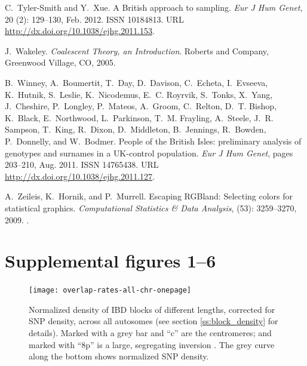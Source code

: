 \documentclass{article}
\begin{document}
\begin{thebibliography}{76}
C.~Tyler-Smith and Y.~Xue.
\newblock A {British} approach to sampling.
\newblock \emph{Eur J Hum Genet}, 20 (2): 129--130, Feb.
  2012.
\newblock ISSN 10184813.
\newblock URL \url{http://dx.doi.org/10.1038/ejhg.2011.153}.

J.~Wakeley.
\newblock \emph{Coalescent Theory, an Introduction}.
\newblock Roberts and Company, Greenwood Village, CO, 2005.

B.~Winney, A.~Boumertit, T.~Day, D.~Davison, C.~Echeta, I.~Evseeva, K.~Hutnik,
  S.~Leslie, K.~Nicodemus, E.~C. Royrvik, S.~Tonks, X.~Yang, J.~Cheshire,
  P.~Longley, P.~Mateos, A.~Groom, C.~Relton, D.~T. Bishop, K.~Black,
  E.~Northwood, L.~Parkinson, T.~M. Frayling, A.~Steele, J.~R. Sampson,
  T.~King, R.~Dixon, D.~Middleton, B.~Jennings, R.~Bowden, P.~Donnelly, and
  W.~Bodmer.
\newblock People of the {British Isles}: preliminary analysis of genotypes and
  surnames in a {UK-control} population.
\newblock \emph{Eur J Hum Genet}, pages 203--210, Aug. 2011.
\newblock ISSN 14765438.
\newblock URL \url{http://dx.doi.org/10.1038/ejhg.2011.127}.

A.~Zeileis, K.~Hornik, and P.~Murrell.
\newblock Escaping {RGBland}: Selecting colors for statistical graphics.
\newblock \emph{Computational Statistics \& Data Analysis}, 
  (53): 3259--3270, 2009.
\newblock {}.

\end{thebibliography}
\clearpage


\section*{Supplemental figures 1--6}


\renewcommand{\thefigure}{S\arabic{figure}}
\setcounter{figure}{0}
\renewcommand{\thetable}{S\arabic{table}}
\setcounter{table}{0}


\begin{figure}[!htp]
  \begin{center}
    \texttt{[image: overlap-rates-all-chr-onepage]}
    \caption{
       Normalized density of IBD blocks of different lengths, corrected for SNP density, across all autosomes
       (see section \ref{ss:block_density} for details).
       Marked with a grey bar and ``c'' are the centromeres; 
       and marked with ``8p'' is a large, segregating inversion \citep{giglio2001olfactory}.
       The grey curve along the bottom shows normalized SNP density. 
      \label{sfig:overlap_all}
    }
  \end{center}
\end{figure}
\end{document}

